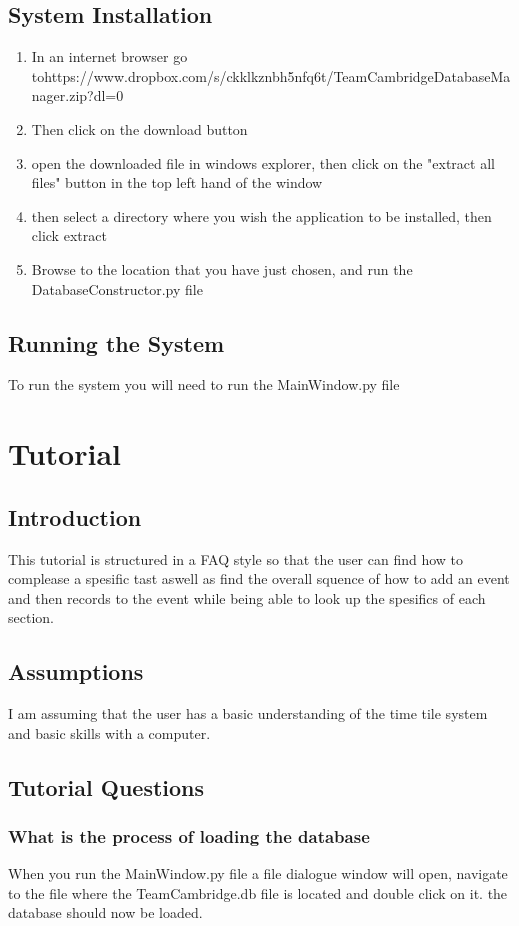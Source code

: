 \subsection{System Installation}
\begin{enumerate}
\item In an internet browser go to\newline https://www.dropbox.com/s/ckklkznbh5nfq6t/TeamCambridgeDatabaseManager.zip?dl=0
\item Then click on the download button
\item open the downloaded file in windows explorer, then click on the "extract all files" button in the top left hand of the window
\item then select a directory where you wish the application to be installed, then click extract
\item Browse to the location that you have just chosen, and run the  DatabaseConstructor.py file
\end{enumerate}
\subsection{Running the System}
To run the system you will need to run the MainWindow.py file
\section{Tutorial}

\subsection{Introduction}
This tutorial is structured in a FAQ style so that the user can find how to complease a spesific tast aswell as find the overall squence of how to add an event and then records to the event while being able to look up the spesifics of each section. 

\subsection{Assumptions}
I am assuming that the user has a basic understanding of the time tile system and basic skills with a computer.
\subsection{Tutorial Questions}

\subsubsection{What is the process of loading the database}
When you run the MainWindow.py file a file dialogue window will open, navigate to the file where the TeamCambridge.db file is located and double click on it. the database should now be loaded.

